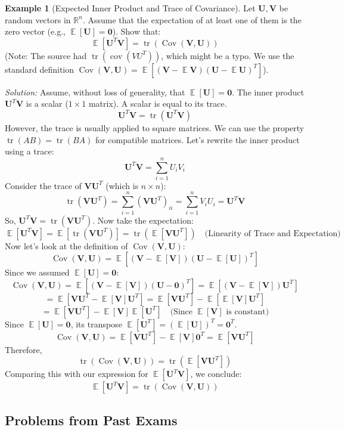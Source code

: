\documentclass[11pt]{article}
\theoremstyle{definition}
\newtheorem{example}[theorem]{Example}
\theoremstyle{remark}
\DeclareMathOperator{\E}{\mathbb{E}}
\DeclareMathOperator{\Cov}{\operatorname{Cov}}
\DeclareMathOperator{\tr}{\operatorname{tr}}
\begin{document}
\begin{example}[Expected Inner Product and Trace of Covariance] \label{ex:trace_innerprod}
    Let $\bm{U}, \bm{V}$ be random vectors in $\mathbb{R}^n$. Assume that the expectation of at least one of them is the zero vector (e.g., $\E[\bm{U}] = \mathbf{0}$). Show that:
    \[ \E[\bm{U}^T\bm{V}] = \tr(\Cov(\bm{V}, \bm{U})) \]
    (Note: The source had $\operatorname{tr}(\operatorname{cov}(VU^T))$, which might be a typo. We use the standard definition $\Cov(\bm{V}, \bm{U}) = \E[(\bm{V}-\E\bm{V})(\bm{U}-\E\bm{U})^T]$).

    \emph{Solution:}
    Assume, without loss of generality, that $\E[\bm{U}] = \mathbf{0}$.
    The inner product $\bm{U}^T\bm{V}$ is a scalar ($1 \times 1$ matrix). A scalar is equal to its trace.
    \[ \bm{U}^T\bm{V} = \tr(\bm{U}^T\bm{V}) \]
    However, the trace is usually applied to square matrices. We can use the property $\tr(AB) = \tr(BA)$ for compatible matrices. Let's rewrite the inner product using a trace:
    \[ \bm{U}^T\bm{V} = \sum_{i=1}^n U_i V_i \]
    Consider the trace of $\bm{V}\bm{U}^T$ (which is $n \times n$):
    \[ \tr(\bm{V}\bm{U}^T) = \sum_{i=1}^n (\bm{V}\bm{U}^T)_{ii} = \sum_{i=1}^n V_i U_i = \bm{U}^T\bm{V} \]
    So, $\bm{U}^T\bm{V} = \tr(\bm{V}\bm{U}^T)$. Now take the expectation:
    \[ \E[\bm{U}^T\bm{V}] = \E[\tr(\bm{V}\bm{U}^T)] = \tr(\E[\bm{V}\bm{U}^T]) \quad \text{(Linearity of Trace and Expectation)} \]
    Now let's look at the definition of $\Cov(\bm{V}, \bm{U})$:
    \[ \Cov(\bm{V}, \bm{U}) = \E[(\bm{V} - \E[\bm{V}])(\bm{U} - \E[\bm{U}])^T] \]
    Since we assumed $\E[\bm{U}] = \mathbf{0}$:
    \[ \Cov(\bm{V}, \bm{U}) = \E[(\bm{V} - \E[\bm{V}])(\bm{U} - \mathbf{0})^T] = \E[(\bm{V} - \E[\bm{V}])\bm{U}^T] \]
    \[ = \E[\bm{V}\bm{U}^T - \E[\bm{V}]\bm{U}^T] = \E[\bm{V}\bm{U}^T] - \E[\E[\bm{V}]\bm{U}^T] \]
    \[ = \E[\bm{V}\bm{U}^T] - \E[\bm{V}]\E[\bm{U}^T] \quad \text{(Since } \E[\bm{V}] \text{ is constant)} \]
    Since $\E[\bm{U}] = \mathbf{0}$, its transpose $\E[\bm{U}^T] = (\E[\bm{U}])^T = \mathbf{0}^T$.
    \[ \Cov(\bm{V}, \bm{U}) = \E[\bm{V}\bm{U}^T] - \E[\bm{V}]\mathbf{0}^T = \E[\bm{V}\bm{U}^T] \]
    Therefore,
    \[ \tr(\Cov(\bm{V}, \bm{U})) = \tr(\E[\bm{V}\bm{U}^T]) \]
    Comparing this with our expression for $\E[\bm{U}^T\bm{V}]$, we conclude:
    \[ \E[\bm{U}^T\bm{V}] = \tr(\Cov(\bm{V}, \bm{U})) \]
\end{example}

\subsection{Problems from Past Exams}
\end{document}
